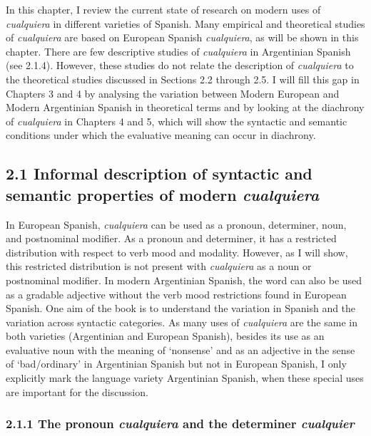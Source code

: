 \documentclass[output=paper]{langscibook}
\begin{document}
In this chapter, I review the current state of research on modern uses of \textit{cualquiera} in different varieties of Spanish. Many empirical and theoretical studies of \textit{cualquiera} are based on European Spanish \textit{cualquiera}, as will be shown in this chapter. There are few descriptive studies of \textit{cualquiera} in Argentinian Spanish (see 2.1.4). However, these studies do not relate the description of \textit{cualquiera} to the theoretical studies discussed in Sections 2.2 through 2.5. I will fill this gap in Chapters 3 and 4 by analysing the variation between Modern European and Modern Argentinian Spanish in theoretical terms and by looking at the diachrony of \textit{cualquiera} in Chapters 4 and 5, which will show the syntactic and semantic conditions under which the evaluative meaning can occur in diachrony. 

\subsection{\textbf{2.1} \textbf{Informal} \textbf{description} \textbf{of} \textbf{syntactic} \textbf{and} \textbf{semantic} \textbf{properties} \textbf{of} \textbf{modern} \textbf{\textit{cualquiera}}}

In European Spanish, \textit{cualquiera} can be used as a pronoun, determiner, noun, and postnominal modifier. As a pronoun and determiner, it has a restricted distribution with respect to verb mood and modality. However, as I will show, this restricted distribution is not present with \textit{cualquiera} as a noun or postnominal modifier. In modern Argentinian Spanish, the word can also be used as a gradable adjective without the verb mood restrictions found in European Spanish. One aim of the book is to understand the variation in Spanish and the variation across syntactic categories. As many uses of \textit{cualquiera} are the same in both varieties (Argentinian and European Spanish), besides its use as an evaluative noun with the meaning of ‘nonsense’ and as an adjective in the sense of ‘bad/ordinary’ in Argentinian Spanish but not in European Spanish, I only explicitly mark the language variety Argentinian Spanish, when these special uses are important for the discussion.

\subsubsection{\textbf{2.1.1} \textbf{The} \textbf{pronoun} \textbf{\textit{cualquiera} }\textbf{and} \textbf{the} \textbf{determiner} \textbf{\textit{cualquier}}}
\end{document}
